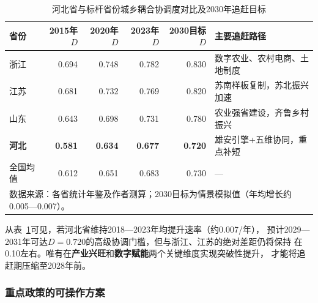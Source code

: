 \documentclass[12pt, a4paper, twoside]{ctexart}
\begin{document}
\begin{table}[H]
  \centering
  \caption{河北省与标杆省份城乡耦合协调度对比及2030年追赶目标}
  \label{tab:benchmark}
  \begin{tabularx}{\linewidth}{l r r r r X}
    \toprule
    \rowcolor{TableHead}
    \color{white}\bfseries 省份 &
    \color{white}\bfseries 2015年$D$ &
    \color{white}\bfseries 2020年$D$ &
    \color{white}\bfseries 2023年$D$ &
    \color{white}\bfseries 2030目标$D$ &
    \color{white}\bfseries 主要追赶路径 \\
    \midrule
    浙江 & 0.694 & 0.748 & 0.782 & 0.830 & 数字农业、农村电商、土地制度 \\
    \rowcolor{TableRow}
    江苏 & 0.681 & 0.732 & 0.769 & 0.820 & 苏南样板复制，苏北振兴加速 \\
    山东 & 0.643 & 0.698 & 0.731 & 0.780 & 农业强省建设，齐鲁乡村振兴 \\
    \rowcolor{TableRow}
    \textbf{河北} & \textbf{0.581} & \textbf{0.634} & \textbf{0.677} &
      \textbf{0.720} &
      雄安引擎+五维协同，重点补短 \\
    全国均值 & 0.612 & 0.651 & 0.683 & 0.730 & — \\
    \bottomrule
    \multicolumn{6}{l}{\footnotesize 数据来源：各省统计年鉴及作者测算；2030目标为情景模拟值（年均增长约0.005—0.007）。}
  \end{tabularx}
\end{table}

从表~\ref{tab:benchmark}可见，若河北省维持2018—2023年均提升速率（约0.007/年），
预计2029—2031年可达$D=0.720$的高级协调门槛，但与浙江、江苏的绝对差距仍将保持
在0.10左右。唯有在\textbf{产业兴旺}和\textbf{数字赋能}两个关键维度实现突破性提升，
才能将追赶期压缩至2028年前。

\subsubsection{重点政策的可操作方案}
\end{document}
